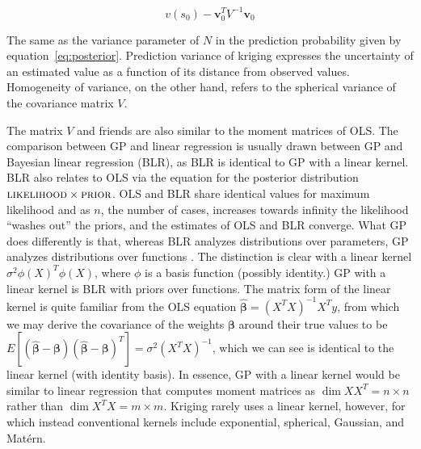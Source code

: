 \documentclass[]{interact}
\theoremstyle{plain}%
\theoremstyle{definition}
\theoremstyle{remark}
\begin{document}
\[v(s_0) - \bm{v}_0^T V^{-1} \bm{v}_0\]

The same as the variance parameter of $N$ in the prediction probability given by equation~\ref{eq:posterior}.  Prediction variance of kriging expresses the uncertainty of an estimated value as a function of its distance from observed values.  Homogeneity of variance, on the other hand, refers to the spherical variance of the covariance matrix $V$.

The matrix $V$ and friends are also similar to the moment matrices of OLS.  The comparison between GP and linear regression is usually drawn between GP and Bayesian linear regression (BLR), as BLR is identical to GP with a linear kernel.  BLR also relates to OLS via the equation for the posterior distribution $\textsc{likelihood} \times \textsc{prior}$.  OLS and BLR share identical values for maximum likelihood and as $n$, the number of cases, increases towards infinity the likelihood ``washes out'' the priors, and the estimates of OLS and BLR converge.  What GP does differently is that, whereas BLR analyzes distributions over parameters, GP analyzes distributions over functions \citep{williams97}.  The distinction is clear with a linear kernel $\sigma^2\phi(X)^T\phi(X)$, where $\phi$ is a basis function (possibly identity.)  GP with a linear kernel is BLR with priors over functions.  The matrix form of the linear kernel is quite familiar from the OLS equation $\hat{\bm{\beta}}=(X^TX)^{-1}X^Ty$, from which we may derive the covariance of the weights $\bm{\beta}$ around their true values to be $E[(\hat{\bm{\beta}} - \bm{\beta})(\hat{\bm{\beta}} - \bm{\beta})^T] = \sigma^2(X^TX)^{-1}$, which we can see is identical to the linear kernel (with identity basis).  In essence, GP with a linear kernel would be similar to linear regression that computes moment matrices as $\dim{XX^T}=n \times n$ rather than $\dim{X^TX}=m \times m$.  Kriging rarely uses a linear kernel, however, for which instead conventional kernels include exponential, spherical, Gaussian, and Mat\'{e}rn.
\end{document}
